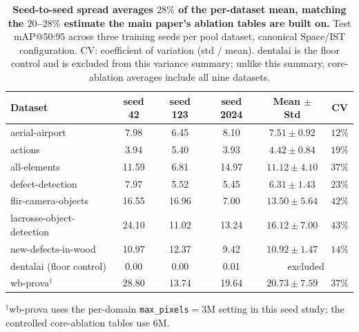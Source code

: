 \documentclass{article}
\begin{document}
\begin{table}[h]
  \centering
  \caption{\textbf{Seed-to-seed spread averages $28\%$ of the per-dataset mean, matching the $20$--$28\%$ estimate the main paper's ablation tables are built on.}
    Test mAP@50:95 across three training seeds per pool dataset, canonical Space/IST configuration.
    CV: coefficient of variation (std / mean).
    dentalai is the floor control and is excluded from this variance summary;
    unlike this summary, core-ablation averages include all nine datasets.
    }
  \label{tab:seed_variance}
  \small
  \setlength{\tabcolsep}{7pt}
  \begin{tabular}{lccccc}
    \toprule
    Dataset & seed 42 & seed 123 & seed 2024 & Mean $\pm$ Std & CV \\
    \midrule
    aerial-airport                     &  7.98 &  6.45 &  8.10 & $7.51 \pm 0.92$  & $12\%$ \\
    actions                            &  3.94 &  5.40 &  3.93 & $4.42 \pm 0.84$  & $19\%$ \\
    all-elements                       & 11.59 &  6.81 & 14.97 & $11.12 \pm 4.10$ & $37\%$ \\
    defect-detection                   &  7.97 &  5.52 &  5.45 & $6.31 \pm 1.43$  & $23\%$ \\
    flir-camera-objects                & 16.55 & 16.96 &  7.00 & $13.50 \pm 5.64$ & $42\%$ \\
    lacrosse-object-detection          & 24.10 & 11.02 & 13.24 & $16.12 \pm 7.00$ & $43\%$ \\
    new-defects-in-wood                & 10.97 & 12.37 &  9.42 & $10.92 \pm 1.47$ & $14\%$ \\
    \midrule
    dentalai (floor control)           &  0.00 &  0.00 &  0.01 & \multicolumn{2}{c}{excluded} \\
    wb-prova$^{\dagger}$               & 28.80 & 13.74 & 19.64 & $20.73 \pm 7.59$ & $37\%$ \\
    \bottomrule
  \end{tabular}
\end{table}

$^{\dagger}$wb-prova uses the per-domain \texttt{max\_pixels}$=3$M setting in
this seed study; the controlled core-ablation tables use 6M.
\end{document}
